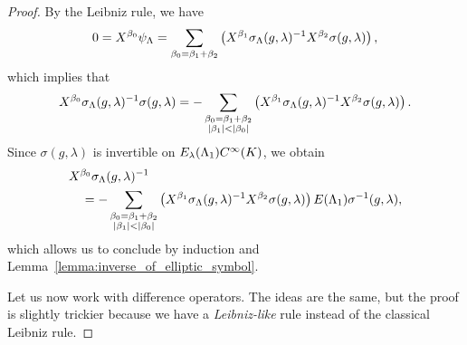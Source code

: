 \begin{proof}
    By the Leibniz rule,
    we have
    \begin{align*}
        0 =
        \LeftDifferentialOperator {\beta_0} \psi_\Lambda
        =
        \sum_{\beta_0 = \beta_1 + \beta_2}
        \left(
        \LeftDifferentialOperator {\beta_1} \sigma_\Lambda(g, \lambda)^{-1}
        \LeftDifferentialOperator {\beta_2} \sigma(g, \lambda)\right),
    \end{align*}
    which implies that
    \begin{align*}
        \LeftDifferentialOperator {\beta_0} \sigma_{\Lambda}(g, \lambda)^{-1} \sigma(g, \lambda)
        = -
        \sum_{\substack{
            \beta_0 = \beta_1 + \beta_2\\
            \abs {\beta_1} < \abs {\beta_0}}
        }
        \left(
        \LeftDifferentialOperator {\beta_1} \sigma_\Lambda(g, \lambda)^{-1}
        \LeftDifferentialOperator {\beta_2} \sigma(g, \lambda) \right).
    \end{align*}
    Since $\sigma(g, \lambda)$ is invertible on $E_\lambda(\Lambda_1) {C^\infty(K)}$,
    we obtain
    \begin{align*}
        &\LeftDifferentialOperator {\beta_0} \sigma_{\Lambda}(g, \lambda)^{-1}\\
        &\quad
        = -
        \sum_{\substack{
            \beta_0 = \beta_1 + \beta_2\\
            \abs {\beta_1} < \abs {\beta_0}}
        }
        \left(
        \LeftDifferentialOperator {\beta_1} \sigma_\Lambda(g, \lambda)^{-1}
        \LeftDifferentialOperator {\beta_2} \sigma(g, \lambda) \right)
        E(\Lambda_1) \sigma^{-1}(g, \lambda),
    \end{align*}
    which allows us to conclude by induction and Lemma~\ref{lemma:inverse_of_elliptic_symbol}.

    Let us now work with difference operators.
    The ideas are the same,
    but the proof is slightly trickier
    because we have a \emph{Leibniz-like} rule instead of the classical Leibniz rule.


\end{proof}
